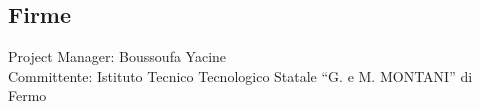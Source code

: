 \documentclass{article}
\begin{document}
\begin{flushleft}
		\subsection{Firme}
		Project Manager: Boussoufa Yacine\\
		Committente: Istituto Tecnico Tecnologico Statale “G. e M. MONTANI” di Fermo
		
	\end{flushleft}
	
	
\end{document}
